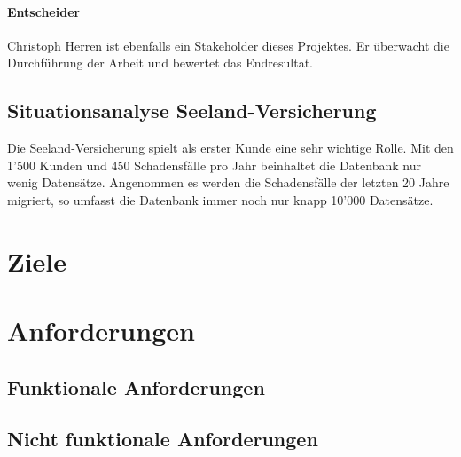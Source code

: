 \documentclass{article}
\begin{document}
\paragraph{Entscheider}
Christoph Herren ist ebenfalls ein Stakeholder dieses Projektes. Er überwacht die Durchführung der Arbeit und bewertet das Endresultat.


\subsection{Situationsanalyse Seeland-Versicherung}
Die Seeland-Versicherung spielt als erster Kunde eine sehr wichtige Rolle. Mit den 1'500 Kunden und 450 Schadensfälle pro Jahr beinhaltet die Datenbank nur wenig Datensätze. Angenommen es werden die Schadensfälle der letzten 20 Jahre migriert, so umfasst die Datenbank immer noch nur knapp 10'000 Datensätze.
\section{Ziele}
\section{Anforderungen}
\subsection{Funktionale Anforderungen}
\subsection{Nicht funktionale Anforderungen}
\end{document}
